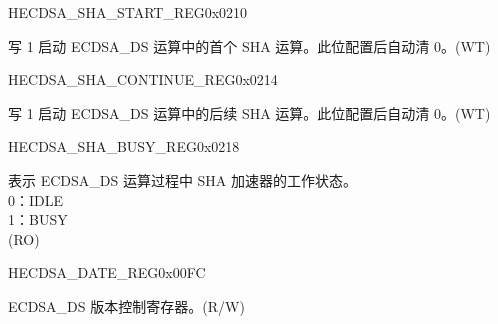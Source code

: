 \begin{register}{H}{ECDSA\_SHA\_START\_REG}{0x0210}\label{regdesc:ECDSASHASTARTREG}
%
%
\regnewline%
\begin{regdesc}\begin{reglist}
\label{fielddesc:ECDSASHASTART}\item [ECDSA\_SHA\_START] 写 1 启动 ECDSA\_DS 运算中的首个 SHA 运算。此位配置后自动清 0。(WT)
\end{reglist}\end{regdesc}
\end{register}


\begin{register}{H}{ECDSA\_SHA\_CONTINUE\_REG}{0x0214}\label{regdesc:ECDSASHACONTINUEREG}
%
%
\regnewline%
\begin{regdesc}\begin{reglist}
\label{fielddesc:ECDSASHACONTINUE}\item [ECDSA\_SHA\_CONTINUE] 写 1 启动 ECDSA\_DS 运算中的后续 SHA 运算。此位配置后自动清 0。(WT)
\end{reglist}\end{regdesc}
\end{register}


\begin{register}{H}{ECDSA\_SHA\_BUSY\_REG}{0x0218}\label{regdesc:ECDSASHABUSYREG}
%
%
\regnewline%
\begin{regdesc}\begin{reglist}
\label{fielddesc:ECDSASHABUSY}\item [ECDSA\_SHA\_BUSY] 表示 ECDSA\_DS 运算过程中 SHA 加速器的工作状态。\\
0：IDLE\\
1：BUSY\\
(RO)
\end{reglist}\end{regdesc}
\end{register}


\begin{register}{H}{ECDSA\_DATE\_REG}{0x00FC}\label{regdesc:ECDSADATEREG}
%
%
\regnewline%
\begin{regdesc}\begin{reglist}
\label{fielddesc:ECDSADATE}\item [ECDSA\_DATE] ECDSA\_DS 版本控制寄存器。(R/W)
\end{reglist}\end{regdesc}
\end{register}
